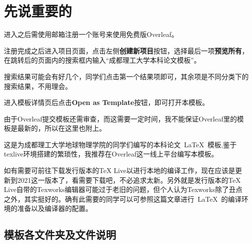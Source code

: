 \chapter{先说重要的}

进入之后需使用邮箱注册一个账号来使用免费版Overleaf。

注册完成之后进入项目页面，点击左侧\textbf{创建新项目}按钮，选择最后一项\textbf{预览所有}，在跳转后的页面内的搜索框内输入“成都理工大学本科论文模板”。

搜索结果可能会有好几个，同学们点击第一个结果项即可，其余项是不同分类下的搜索结果，不用理会。

进入模板详情页后点击\textbf{Open as Template}按钮，即可打开本模板。

由于Overleaf提交模板还需审查，而这需要一定时间，我不能保证Overleaf里的模板是最新的，所以在这里也附上。

这是为成都理工大学地球物理学院的同学们编写的本科论文~\LaTeX~模板,鉴于texlive环境搭建的繁琐性，我推荐在Overleaf这一线上平台编写本模板。

如有需要可前往下载发行版本的TeX Live以进行本地的编译工作，现在应该是更新到2021这一版本了，看需要下载吧，不必追求太新。另外就是发行版本的TeX Live自带的Texworks编辑器可能过于老旧的问题，但个人认为Texworks除了丑点之外，其实挺好的。确有此需要的同学可以可参照这篇文章进行~\LaTeX~的编译环境的准备以及编译器的配置。

\section{模板各文件夹及文件说明}

